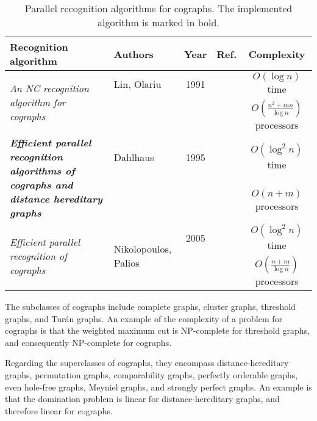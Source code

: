 \begin{table}[ht]
\centering
\begin{tabular}{| p{37mm} | p{19mm} | c | c | c |}
\hline
Recognition algorithm & Authors & Year & Ref. & Complexity \\ [0.5ex] 
\hline\hline
\multirow{2}{*}{\parbox{37mm}{\emph{An NC recognition algorithm for cographs}}} &
Lin, Olariu &
1991 & \cite{Lin1991AnNR} &
$O(\log{n})$ time \\
&  &  &  & $O(\frac{n^2 + mn}{\log{n}})$ processors
\\[2pt] \hline
\multirow{2}{*}{\parbox{37mm}{\vspace{2pt}\textbf{\emph{Efficient parallel recognition algorithms of cographs and distance hereditary graphs}}}} &
Dahlhaus & 1995 & \cite{dahlhaus_95} &
$O(\log^2{n})$ time \\
&  &  &  & $O(n + m)$ processors
\\[38pt] \hline
\multirow{2}{*}{\parbox{37mm}{\emph{Efficient parallel recognition of cographs}}} &
\multirow{2}{*}{\parbox{19mm}{Nikolopoulos, Palios}} &
2005 &
\cite{nikolopoulos_palios_05} & $O(\log^2{n})$ time\\
 & & & & $O(\frac{n + m}{\log{n}})$ processors \\[2pt]
\hline
\end{tabular}
\caption{Parallel recognition algorithms for cographs. The implemented algorithm is marked in bold.}
\label{tbl:parallel_recognition_algorithms}
\end{table}

The subclasses of cographs include complete graphs, cluster graphs, threshold graphs, and Turán graphs. An example of the complexity of a problem for cographs is that the weighted maximum cut is NP-complete for threshold graphs, and consequently NP-complete for cographs.

Regarding the superclasses of cographs, they encompass distance-hereditary graphs, permutation graphs, comparability graphs, perfectly orderable graphs, even hole-free graphs, Meyniel graphs, and strongly perfect graphs. An example is that the domination problem is linear for distance-hereditary graphs, and therefore linear for cographs.


